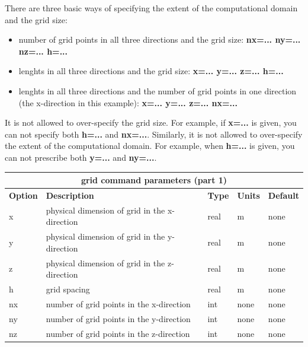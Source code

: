 \documentclass[11pt]{report}
\begin{document}
There are three basic ways of specifying the extent of the computational domain and the grid size:  
\begin{itemize}
   \item number of grid points in all three directions and the grid size: {\bf nx=... ny=... nz=... h=...}
   \item lenghts in all three directions and the grid size: {\bf x=... y=... z=... h=...}
   \item lenghts in all three directions and the number of grid points in one direction (the
   x-direction in this example): {\bf x=... y=... z=... nx=...}
\end{itemize}
It is not allowed to over-specify the grid size. For example, if {\bf x=...} is given, you can not
specify both {\bf h=...} and {\bf nx=...}. Similarly, it is not allowed to over-specify the extent
of the computational domain. For example, when {\bf h=...} is given, you can not prescribe both {\bf
  y=...} and {\bf ny=...}.
%
\begin{center}
\begin{tabular}{|l|p{8cm}|l|l|l|} \hline
\multicolumn{5}{|c|}{\bf grid command parameters (part 1)}\\ \hline
\bf{Option} & \bf{Description} & \bf{Type} & \bf{Units} & \bf{Default}\\ \hline \hline
x & physical dimension of grid in the x-direction & real & m & none\\ \hline
y & physical dimension of grid in the y-direction & real & m & none\\ \hline
z & physical dimension of grid in the z-direction & real & m & none\\ \hline
\hline
h & grid spacing & real & m & none\\ \hline
\hline
nx & number of grid points in the x-direction & int & none & none\\ \hline
ny & number of grid points in the y-direction & int & none & none\\ \hline	
nz & number of grid points in the z-direction & int & none & none\\ \hline	
\end{tabular}
\end{center}
\end{document}
